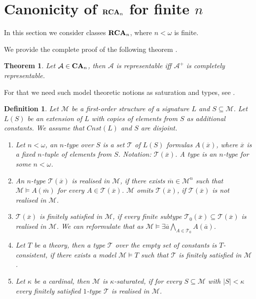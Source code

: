 \documentclass[a4paper]{article}
\theoremstyle{defin}
\newtheorem{defin}{Definition}
\theoremstyle{theorem}
\newtheorem{theorem}{Theorem}
\theoremstyle{claim}
\theoremstyle{prop}
\theoremstyle{lemma}
\theoremstyle{fact}
\theoremstyle{ex}
\theoremstyle{col}
\begin{document}
\section{Canonicity of ${\bf RCA}_n$ for finite $n$}

In this section we consider classes ${\bf RCA}_n$, where $n < \omega$ is finite.

We provide the complete proof of the following theorem \cite[Theorem 3.4.3]{hirsch2013completions}.
\begin{theorem}\label{finitecanon}
Let $\mathcal{A} \in {\bf CA}_n$, then $\mathcal{A}$ is representable iff $\mathcal{A}^{+}$ is completely representable.
\end{theorem}

For that we need such model theoretic notions as saturation and types, see \cite[Section 6.3]{hodges1993model}.

\begin{defin} Let $\mathcal{M}$ be a first-order structure of a signature $L$ and $S \subseteq \mathcal{M}$. Let $L(S)$ be an extension of $L$ with copies of elements from $S$ as additional constants. We assume that $Cnst(L)$ and $S$ are disjoint.

\begin{enumerate}
\item Let $n < \omega$, an $n$-type over $S$ is a set $\mathcal{T}$ of $L(S)$ formulas $A(\overline{x})$, where $\overline{x}$ is a fixed $n$-tuple of elements from $S$. Notation: $\mathcal{T}(\overline{x})$. A type is an $n$-type for some $n < \omega$.
\item An $n$-type $\mathcal{T}(\overline{x})$ is realised in $\mathcal{M}$, if there exists $\overline{m} \in \mathcal{M}^n$ such that $\mathcal{M} \models A(\overline{m})$ for every $A \in \mathcal{T}(\overline{x})$. $\mathcal{M}$ omits $\mathcal{T}(\overline{x})$, if $\mathcal{T}(\overline{x})$ is not realised in $\mathcal{M}$.
\item $\mathcal{T}(\overline{x})$ is finitely satisfied in $\mathcal{M}$, if every finite subtype $\mathcal{T}_0(\overline{x}) \subseteq \mathcal{T}(\overline{x})$ is realised in $\mathcal{M}$. We can reformulate that as $\mathcal{M} \models \exists \overline{a} \bigwedge \limits_{A \in \mathcal{T}_0} A(\overline{a})$.
\item Let $T$ be a theory, then a type $\mathcal{T}$ over the empty set of constants is $T$-consistent, if there exists a model $\mathcal{M} \models T$ such that $\mathcal{T}$ is finitely satisfied in $\mathcal{M}$.
\item Let $\kappa$ be a cardinal, then $\mathcal{M}$ is $\kappa$-saturated, if for every $S \subseteq \mathcal{M}$ with $|S| < \kappa$ every finitely satisfied $1$-type $\mathcal{T}$ is realised in $\mathcal{M}$.
\end{enumerate}
\end{defin}
\end{document}
